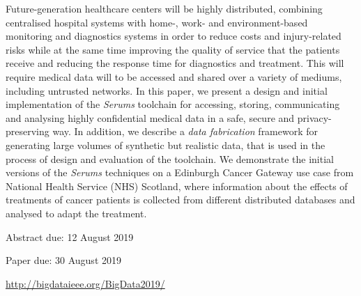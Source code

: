 Future-generation healthcare centers will be highly distributed, combining centralised hospital systems with home-, work- and environment-based monitoring and diagnostics systems in order to reduce costs and injury-related risks while at the same time improving the quality of service that the patients receive and reducing the response time for diagnostics and treatment. This will require medical data will to be accessed and shared over a variety of mediums, including untrusted networks. In this paper, we present a design and initial implementation of the \emph{Serums} toolchain for accessing, storing, communicating and analysing highly confidential medical data in a safe, secure and privacy-preserving way. In addition, we describe a \emph{data fabrication} framework for generating large volumes of synthetic but realistic data, that is used in the process of design and evaluation of the toolchain. We demonstrate the initial versions of the \emph{Serums} techniques on a Edinburgh Cancer Gateway use case from National Health Service (NHS) Scotland, where information about the effects of treatments of cancer patients is collected from different distributed databases and analysed to adapt the treatment.

Abstract due: 12 August 2019

Paper due: 30 August 2019

\url{http://bigdataieee.org/BigData2019/}
